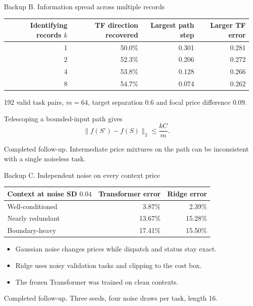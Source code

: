 \documentclass[aspectratio=169,11pt]{beamer}
\newcommand{\norm}[1]{\lVert #1\rVert_2}
\newcommand{\source}[1]{\par\vfill{\color{muted}\tiny #1}}
\begin{document}
\begin{frame}[noframenumbering]{Backup B. Information spread across multiple records}
\begin{center}
\begin{tabular}{rrrr}
\toprule
Identifying records \(k\)&TF direction recovered&Largest path step&Larger TF error\\
\midrule
1&50.0\%&0.301&0.281\\
2&52.3\%&0.206&0.272\\
4&53.8\%&0.128&0.266\\
8&54.7\%&0.074&0.262\\
\bottomrule
\end{tabular}
\end{center}
\vspace{4mm}
\small 192 valid task pairs, \(m=64\), target separation 0.6 and focal
price difference 0.09.

\vspace{3mm}
Telescoping a bounded-input path gives
\[
\norm{f(S')-f(S)}\le\frac{kC}{m}.
\]
\source{Completed follow-up. Intermediate price mixtures on the path can be inconsistent with a single noiseless task.}
\end{frame}

\begin{frame}[noframenumbering]{Backup C. Independent noise on every context price}
\begin{center}
\begin{tabular}{lrr}
\toprule
Context at noise SD \(0.04\)&Transformer error&Ridge error\\
\midrule
Well-conditioned&3.87\%&2.39\%\\
Nearly redundant&13.67\%&15.28\%\\
Boundary-heavy&17.41\%&15.50\%\\
\bottomrule
\end{tabular}
\end{center}
\vspace{5mm}
\begin{itemize}
\item Gaussian noise changes prices while dispatch and status stay exact.
\item Ridge uses noisy validation tasks and clipping to the cost box.
\item The frozen Transformer was trained on clean contexts.
\end{itemize}
\source{Completed follow-up. Three seeds, four noise draws per task, length 16.}
\end{frame}
\end{document}
